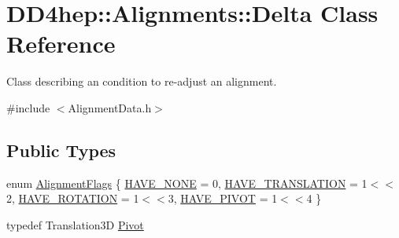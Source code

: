 \hypertarget{class_d_d4hep_1_1_alignments_1_1_delta}{}\section{D\+D4hep\+:\+:Alignments\+:\+:Delta Class Reference}
\label{class_d_d4hep_1_1_alignments_1_1_delta}


Class describing an condition to re-\/adjust an alignment.  




{\ttfamily \#include $<$Alignment\+Data.\+h$>$}

\subsection*{Public Types}
\begin{DoxyCompactItemize}
\item 
enum \hyperlink{class_d_d4hep_1_1_alignments_1_1_delta_ab10dd6760463baa51d8b585aaa4c70aa}{Alignment\+Flags} \{ \hyperlink{class_d_d4hep_1_1_alignments_1_1_delta_ab10dd6760463baa51d8b585aaa4c70aaadcf1a03f3ac4ff2143e681c760133e4b}{H\+A\+V\+E\+\_\+\+N\+O\+NE} = 0, 
\hyperlink{class_d_d4hep_1_1_alignments_1_1_delta_ab10dd6760463baa51d8b585aaa4c70aaa709ec8fdc3ef1322d009d78a787775bf}{H\+A\+V\+E\+\_\+\+T\+R\+A\+N\+S\+L\+A\+T\+I\+ON} = 1$<$$<$2, 
\hyperlink{class_d_d4hep_1_1_alignments_1_1_delta_ab10dd6760463baa51d8b585aaa4c70aaa79ecddccc03ca432d87a65be9ff4e54e}{H\+A\+V\+E\+\_\+\+R\+O\+T\+A\+T\+I\+ON} = 1$<$$<$3, 
\hyperlink{class_d_d4hep_1_1_alignments_1_1_delta_ab10dd6760463baa51d8b585aaa4c70aaad7e7bc1c957ff212a4bfcade0e1647b9}{H\+A\+V\+E\+\_\+\+P\+I\+V\+OT} = 1$<$$<$4
 \}
\item 
typedef Translation3D \hyperlink{class_d_d4hep_1_1_alignments_1_1_delta_a9ff8cc825f916a4ae84f1780c11f2519}{Pivot}
\end{DoxyCompactItemize}
